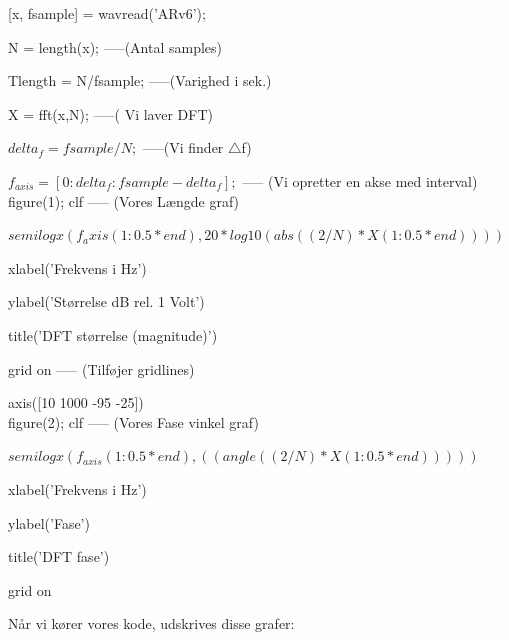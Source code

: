 \documentclass[12pt, letterpaper]{article}
\begin{document}
[x, fsample] = wavread('ARv6');

N = length(x);       -----(Antal samples)
     
Tlength = N/fsample;     -----(Varighed i sek.)              

X = fft(x,N);   -----( Vi laver DFT)                       

$delta_f = fsample/N;$  -----(Vi finder $\bigtriangleup$f)

$f_{axis} = [0:delta_f:fsample-delta_f];$ ----- (Vi opretter en akse med interval)\\

figure(1); clf  ----- (Vores Længde graf)  
     
$semilogx(f_axis(1:0.5*end), 20*log10(abs((2/N)*X(1:0.5*end))))$

xlabel('Frekvens i Hz')

ylabel('Størrelse dB rel. 1 Volt') 

title('DFT størrelse (magnitude)')

grid on       -----   (Tilføjer gridlines) 
  
axis([10 1000 -95 -25])\\

figure(2); clf 		-----  (Vores Fase vinkel graf)  
                   
$semilogx(f_{axis}(1:0.5*end), ((angle((2/N)*X(1:0.5*end)))))$

xlabel('Frekvens i Hz')

ylabel('Fase')

title('DFT fase')

grid on

Når vi kører vores kode, udskrives disse grafer: 
\end{document}
